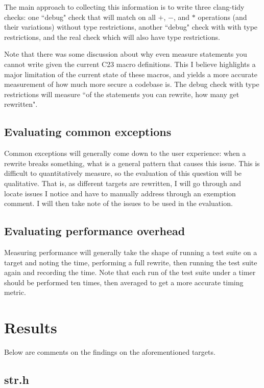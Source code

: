 The main approach to collecting this information is to write three clang-tidy checks: one ``debug" check that will match on all $+$, $-$, and $*$ operations (and their variations) without type restrictions, another ``debug" check with with type restrictions, and the real check which will also have type restrictions.

Note that there was some discussion about why even measure statements you cannot write given the current C23 macro definitions. This I believe highlights a major limitation of the current state of these macros, and yields a more accurate measurement of how much more secure a codebase is. The debug check with type restrictions will measure ``of the statements you can rewrite, how many get rewritten".

\subsection{Evaluating common exceptions}

Common exceptions will generally come down to the user experience: when a rewrite breaks something, what is a general pattern that causes this issue. This is difficult to quantitatively measure, so the evaluation of this question will be qualitative. That is, as different targets are rewritten, I will go through and locate issues I notice and have to manually address through an exemption comment. I will then take note of the issues to be used in the evaluation.

\subsection{Evaluating performance overhead}

Measuring performance will generally take the shape of running a test suite on a target and noting the time, performing a full rewrite, then running the test suite again and recording the time. Note that each run of the test suite under a timer should be performed ten times, then averaged to get a more accurate timing metric.

\section{Results}

Below are comments on the findings on the aforementioned targets.

\subsection{str.h}

